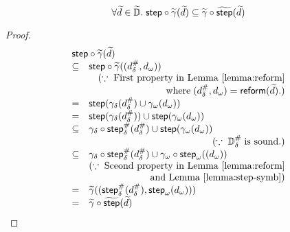\begin{lemma}\label{lemma:comb-sound2}
  \[
    \forall \widetilde{d} \in \widetilde{\mathbb{D}}. \; \textsf{step} \circ \widetilde{\gamma}(\widetilde{d}) \subseteq
    \widetilde{\gamma} \circ \widetilde{\textsf{step}}(\widetilde{d})\\
  \]
\end{lemma}
\begin{proof}
  \[
    \begin{array}{cl}
      \multicolumn{2}{l}{
        \step \circ \combgamma(\combelem)
      }\\
      \subseteq& \step \circ \combgamma((\sabselem, \symbelem))\\
       & \multicolumn{1}{r}{(\because \; \text{First property in
       Lemma~\ref{lemma:reform}}}\\
       & \multicolumn{1}{r}{\text{where} \; (\sabselem, \symbelem)
       = \reform(\combelem).)}\\

      =& \step(\sgamma(\sabselem) \cup \symbgamma(\symbelem))\\
      =& \step(\sgamma(\sabselem)) \cup \step(\symbgamma(\symbelem))\\
      \subseteq& \sgamma \circ \sabsstep(\sabselem) \cup \step(\symbgamma(\symbelem))\\
      & \multicolumn{1}{r}{(\because \; \sabsdom \; \text{is sound.})}\\
      \subseteq& \sgamma \circ \sabsstep(\sabselem) \cup \symbgamma \circ
      \symbstep((\symbelem))\\
               & \multicolumn{1}{r}{(\because \; \text{Sceond property in
               Lemma~\ref{lemma:reform}} }\\
               & \multicolumn{1}{r}{\text{and Lemma~\ref{lemma:step-symb}})}\\
      =& \combgamma((\sabsstep(\sabselem), \symbstep(\symbelem)))\\
      =& \combgamma \circ \combstep(\combelem)\\

    \end{array}
  \]
\end{proof}

